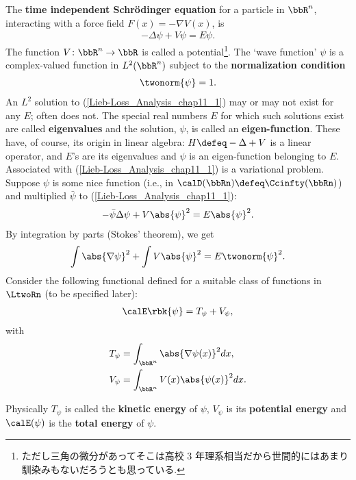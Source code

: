 \documentclass[openany, a4paper, oneside]{jsbook}
\begin{document}
The \textbf{time independent Schr\"odinger equation} for a particle in $\bbR^n$, interacting with a force field $F (x) = - \nabla V (x)$, is
\begin{align}
 -\Delta \psi + V \psi = E \psi. \label{Lieb-Loss_Analysis_chap11_1}
\end{align}
The function $V \colon \bbR^n \to \bbR$ is called a potential\footnote{ただし三角の微分があってそこは高校 3 年理系相当だから世間的にはあまり馴染みもないだろうとも思っている.}.
The `wave function' $\psi$ is a complex-valued function in $L^2 (\bbR^n)$ subject to the \textbf{normalization condition}
\begin{align}
 \twonorm{\psi} = 1.
\end{align}
An $L^2$ solution to (\ref{Lieb-Loss_Analysis_chap11_1}) may or may not exist for any $E$; often does not.
The special real numbers $E$ for which such solutions exist are called \textbf{eigenvalues} and the solution,
$\psi$, is called an \textbf{eigen-function}.
These have, of course, its origin in linear algebra: $H \defeq - \Delta + V$ is a linear operator,
and $E$'s are its eigenvalues and $\psi$ is an eigen-function belonging to $E$.
Associated with (\ref{Lieb-Loss_Analysis_chap11_1}) is a variational problem.
Suppose $\psi$ is some nice function (i.e., in $\calD (\bbRn) \defeq \Ccinfty (\bbRn)$) and multiplied $\bar{\psi}$ to (\ref{Lieb-Loss_Analysis_chap11_1}):
\begin{align}
 -\bar{\psi} \Delta \psi + V \abs{\psi}^2 = E \abs{\psi}^2.
\end{align}
By integration by parts (Stokes' theorem), we get
\begin{align}
 \int \abs{\nabla \psi}^2 + \int V \abs{\psi}^2 = E \twonorm{\psi}^2.
\end{align}
Consider the following functional defined for a suitable class of functions in $\LtwoRn$ (to be specified later):
\begin{align}
 \calE \rbk{\psi}
 =
 T_{\psi} + V_{\psi}, \label{Lieb-Loss_Analysis_chap11_3}
\end{align}
with
\begin{align}
 T_{\psi}
 &=
 \int_{\bbR^n} \abs{\nabla \psi (x)}^2 dx, \\
 V_{\psi}
 &=
 \int_{\bbR^n} V (x) \abs{\psi (x)}^2 dx.
\end{align}

Physically $T_{\psi}$ is called the \textbf{kinetic energy} of $\psi$, $V_{\psi}$ is its \textbf{potential energy}
and $\calE (\psi)$ is the \textbf{total energy} of $\psi$.
\end{document}
